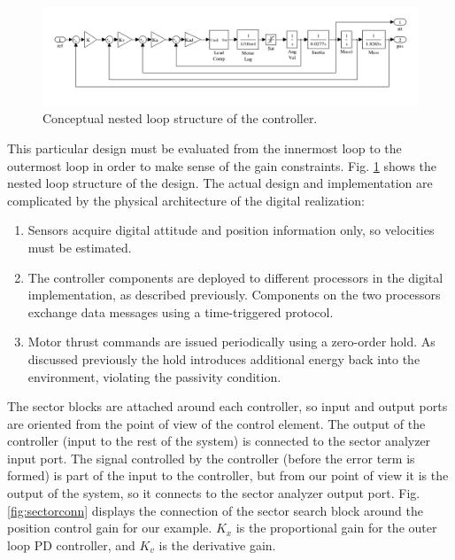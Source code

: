 \begin{figure}[thpb]
\centering
\includegraphics[width=\columnwidth]{img/quadrotor_loops}
    \caption{Conceptual nested loop structure of the controller.}
    \label{fig:quadrotor_loops}
\end{figure}

This particular design must be evaluated from the innermost loop to the outermost loop in order to make sense of the gain constraints. Fig. \ref{fig:quadrotor_loops} shows the nested loop structure of the design.  The actual design and implementation are complicated by the physical architecture of the digital realization: 

\begin{enumerate}
 \item Sensors acquire digital attitude and position information only, so velocities must be estimated.
 \item The controller components are deployed to different processors in the digital implementation, as described previously. Components on the two processors exchange data messages using a time-triggered protocol.
 \item Motor thrust commands are issued periodically using a zero-order hold.  As discussed previously the hold introduces additional energy back into the environment, violating the passivity condition.
\end{enumerate}

The sector blocks are attached around each controller, so input and output ports are oriented from the point of view of the control element.  The output of the controller (input to the rest of the system) is connected to the sector analyzer input port.  The signal controlled by the controller (before the error term is formed) is part of the input to the controller, but from our point of view it is the output of the system, so it connects to the sector
analyzer output port.  Fig. \ref{fig:sectorconn} displays the connection of the sector search block around the position control gain for our example. $K_x$ is the proportional gain for the outer loop PD controller, and $K_v$ is the derivative gain.  

